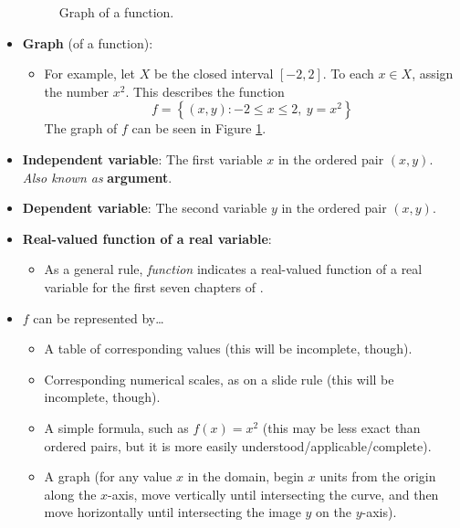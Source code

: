 \documentclass[../main.tex]{subfiles}
\begin{document}
\begin{itemize}
\begin{figure}[h!]
        \caption{Graph of a function.}
        \label{fig:graphOfFunction}
    \end{figure}
    \item \textbf{Graph} (of a function): 
    \begin{itemize}
        \item For example, let $X$ be the closed interval $[-2,2]$. To each $x\in X$, assign the number $x^2$. This describes the function
        \begin{equation*}
            f = \left\{ (x,y):-2\leq x\leq 2,\ y=x^2 \right\}
        \end{equation*}
        The graph of $f$ can be seen in Figure \ref{fig:graphOfFunction}.
    \end{itemize}
    \item \textbf{Independent variable}: The first variable $x$ in the ordered pair $(x,y)$. \emph{Also known as} \textbf{argument}.
    \item \textbf{Dependent variable}: The second variable $y$ in the ordered pair $(x,y)$.
    \item \textbf{Real-valued function of a real variable}: 
    \begin{itemize}
        \item As a general rule, \emph{function} indicates a real-valued function of a real variable for the first seven chapters of \cite{bib:Thomas}.
    \end{itemize}
    \item $f$ can be represented by\dots
    \begin{itemize}
        \item A table of corresponding values (this will be incomplete, though).
        \item Corresponding numerical scales, as on a slide rule (this will be incomplete, though).
        \item A simple formula, such as $f(x)=x^2$ (this may be less exact than ordered pairs, but it is more easily understood/applicable/complete).
        \item A graph (for any value $x$ in the domain, begin $x$ units from the origin along the $x$-axis, move vertically until intersecting the curve, and then move horizontally until intersecting the image $y$ on the $y$-axis).

\end{itemize}
\end{itemize}
\end{document}
